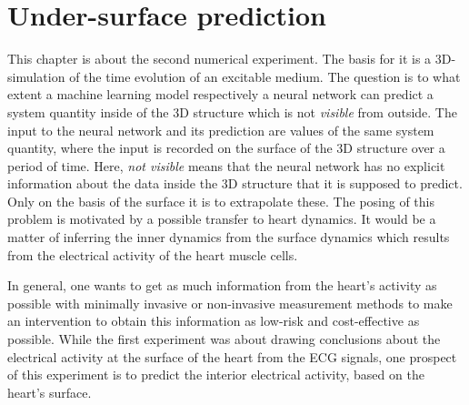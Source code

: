 \chapter{Under-surface prediction}


This chapter is about the second numerical experiment. The basis for it is a 3D-simulation of the time evolution of an excitable medium. The question is to what extent a machine learning model respectively a neural network can predict a system quantity inside of the 3D structure which is not \textit{visible} from outside. The input to the neural network and its prediction are values of the same system quantity, where the input is recorded on the surface of the 3D structure over a period of time. Here, \textit{not visible} means that the neural network has no explicit information about the data inside the 3D structure that it is supposed to predict. Only on the basis of the surface it is to extrapolate these. The posing of this problem is motivated by a possible transfer to heart dynamics. It would be a matter of inferring the inner dynamics from the surface dynamics which results from the electrical activity of the heart muscle cells. 

In general, one wants to get as much information from the heart's activity as possible with minimally invasive or non-invasive measurement methods to make an intervention to obtain this information as low-risk and cost-effective as possible. While the first experiment was about drawing conclusions about the electrical activity at the surface of the heart from the ECG signals, one prospect of this experiment is to predict the interior electrical activity, based on the heart's surface.

